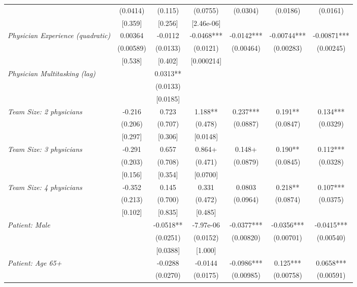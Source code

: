 \begin{table}[htbp]
{\begin{threeparttable}[t]
\begin{tabular}{lcccccc}
          & (0.0414) & (0.115) & (0.0755) & (0.0304) & (0.0186) & (0.0161) \\
          & [0.359] & [0.256] & [2.46e-06] &       &       &  \\
    \textit{Physician Experience (quadratic)} & 0.00364 & -0.0112 & -0.0468*** & -0.0142*** & -0.00744*** & -0.00871*** \\
          & (0.00589) & (0.0133) & (0.0121) & (0.00464) & (0.00283) & (0.00245) \\
          & [0.538] & [0.402] & [0.000214] &       &       &  \\
    \textit{Physician Multitasking (lag)} &       & 0.0313** &       &       &       &  \\
          &       & (0.0133) &       &       &       &  \\
          &       & [0.0185] &       &       &       &  \\
    \textit{Team Size: 2 physicians} & -0.216 & 0.723 & 1.188** & 0.237*** & 0.191** & 0.134*** \\
          & (0.206) & (0.707) & (0.478) & (0.0887) & (0.0847) & (0.0329) \\
          & [0.297] & [0.306] & [0.0148] &       &       &  \\
    \textit{Team Size: 3 physicians} & -0.291 & 0.657 & 0.864+ & 0.148+ & 0.190** & 0.112*** \\
          & (0.203) & (0.708) & (0.471) & (0.0879) & (0.0845) & (0.0328) \\
          & [0.156] & [0.354] & [0.0700] &       &       &  \\
    \textit{Team Size: 4 physicians} & -0.352 & 0.145 & 0.331 & 0.0803 & 0.218** & 0.107*** \\
          & (0.213) & (0.700) & (0.472) & (0.0964) & (0.0874) & (0.0375) \\
          & [0.102] & [0.835] & [0.485] &       &       &  \\
    \textit{Patient: Male} &       & -0.0518** & -7.97e-06 & -0.0377*** & -0.0356*** & -0.0415*** \\
          &       & (0.0251) & (0.0152) & (0.00820) & (0.00701) & (0.00540) \\
          &       & [0.0388] & [1.000] &       &       &  \\
    \textit{Patient: Age 65+} &       & -0.0288 & -0.0144 & -0.0986*** & 0.125*** & 0.0658*** \\
          &       & (0.0270) & (0.0175) & (0.00985) & (0.00758) & (0.00591) \\

\end{tabular}
\end{threeparttable}}
\end{table}
